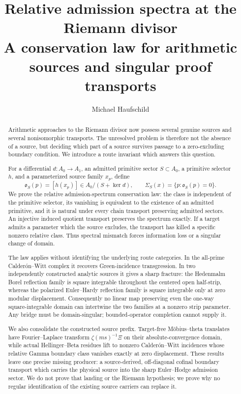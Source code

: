 \documentclass[11pt]{article}
\title{\textbf{Relative admission spectra at the Riemann divisor}\\
\large A conservation law for arithmetic sources and singular proof transports}
\author{Michael Haufschild}
\date{}
\theoremstyle{definition}
\theoremstyle{remark}
\begin{document}
\maketitle

\begin{abstract}
Arithmetic approaches to the Riemann divisor now possess several genuine
sources and several nonisomorphic transports.  The unresolved problem is
therefore not the absence of a source, but deciding which part of a source
survives passage to a zero-excluding boundary condition.  We introduce a
route invariant which answers this question.

For a differential \(d:A_0\to A_1\), an admitted primitive sector
\(S\subset A_0\), a primitive selector \(h\), and a parameterized source
family \(x_p\), define
\[
 \mathfrak o_S(p)=[h(x_p)]\in A_0/(S+\ker d),\qquad
 \Sigma_S(x)=\{p:\mathfrak o_S(p)=0\}.
\]
We prove the relative admission-spectrum conservation law: the class is
independent of the primitive selector, its vanishing is equivalent to the
existence of an admitted primitive, and it is natural under every chain
transport preserving admitted sectors.  An injective induced quotient
transport preserves the spectrum exactly.  If a target admits a parameter
which the source excludes, the transport has killed a specific nonzero
relative class.  Thus spectral mismatch forces information loss or a
singular change of domain.

The law applies without identifying the underlying route categories.  In
the all-prime Calder\'on--Witt complex it recovers Green-incidence
transgression.  In two independently constructed analytic sources it gives
a sharp fracture: the Hedenmalm Borel reflection family is square
integrable throughout the centered open half-strip, whereas the polarized
Euler--Hardy reflection family is square integrable only at zero modular
displacement.  Consequently no linear map preserving even the one-way
square-integrable domain can intertwine the two families at a nonzero strip
parameter.  Any bridge must be domain-singular; bounded-operator completion
cannot supply it.

We also consolidate the constructed source prefix.  Target-free
M\"obius--theta translates have Fourier--Laplace transform
\(\zeta(ms)^{-1}\Xi\) on their absolute-convergence domain, while actual
Hellinger--Beta residues lift to nonzero Calder\'on--Witt incidences whose
relative Gamma boundary class vanishes exactly at zero displacement.
These results leave one precise missing producer: a source-derived,
off-diagonal cofinal boundary transport which carries the physical source
into the sharp Euler--Hodge admission sector.  We do not prove that landing
or the Riemann hypothesis; we prove why no regular identification of the
existing source carriers can replace it.
\end{abstract}
\end{document}
